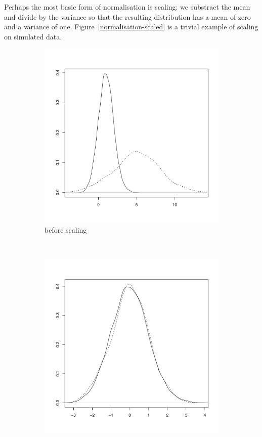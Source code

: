 Perhaps the most basic form of normalisation is scaling: we substract the mean and divide by the variance so that the resulting distribution has a mean of zero and a variance of one.
Figure~\ref{normalisation-scaled} is a trivial example of scaling on simulated data.

\begin{figure}[ht]
\begin{subfigure}[b]{.5\textwidth}
\centering
\includegraphics[scale=.4]{figures/normalisation-scaled-a.pdf} 
\caption{before scaling}
\end{subfigure}
~
\begin{subfigure}[b]{.5\textwidth}
\centering
\includegraphics[scale=.4]{figures/normalisation-scaled-b.pdf} 

\end{subfigure}
\end{figure}
